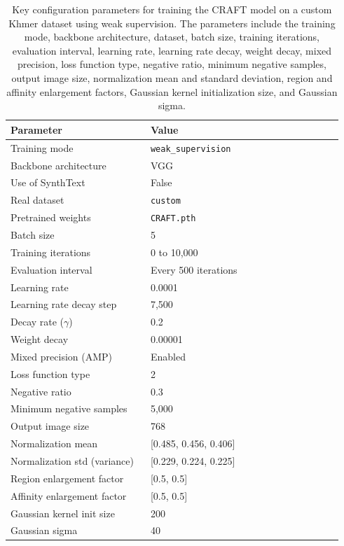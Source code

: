 \begin{table}[ht]
\centering
\begin{tabular}{|p{0.4\linewidth}|p{0.55\linewidth}|}
\hline
\textbf{Parameter} & \textbf{Value} \\
\hline
Training mode & \texttt{weak\_supervision} \\
Backbone architecture & VGG \\
Use of SynthText & False \\ 
Real dataset & \texttt{custom} \\
Pretrained weights & \texttt{CRAFT.pth} \\
Batch size & 5 \\
Training iterations & 0 to 10,000 \\
Evaluation interval & Every 500 iterations \\
Learning rate & 0.0001 \\
Learning rate decay step & 7,500 \\
Decay rate ($\gamma$) & 0.2 \\
Weight decay & 0.00001 \\
Mixed precision (AMP) & Enabled \\
Loss function type & 2 \\
Negative ratio & 0.3 \\
Minimum negative samples & 5,000 \\
Output image size & 768 \\
Normalization mean & [0.485, 0.456, 0.406] \\
Normalization std (variance) & [0.229, 0.224, 0.225] \\
Region enlargement factor & [0.5, 0.5] \\
Affinity enlargement factor & [0.5, 0.5] \\
Gaussian kernel init size & 200 \\
Gaussian sigma & 40 \\
\hline
\end{tabular}
\caption{Key configuration parameters for training the CRAFT model on a custom Khmer dataset 
using weak supervision. The parameters include the training mode, backbone architecture, 
dataset, batch size, training iterations, evaluation interval, learning rate, learning rate decay, 
weight decay, mixed precision, loss function type, negative ratio, minimum negative samples, 
output image size, normalization mean and standard deviation, region and affinity enlargement 
factors, Gaussian kernel initialization size, and Gaussian sigma.}
\label{tab:craft-training-config}
\end{table}


